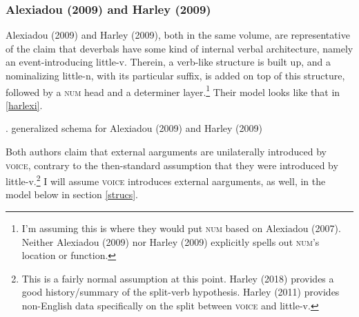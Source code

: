 \documentclass[12pt]{article}
\newcommand*{\textsub}[1]{\ensuremath{_\textrm{{\scriptsize #1}}}}
\begin{document}
\doublespacing


\subsubsection{Alexiadou (2009) and Harley (2009)}\label{priors3.2}

Alexiadou (2009) and Harley (2009), both in the same volume, are representative of the claim that deverbals have some kind of internal verbal architecture, namely an event-introducing little-v. Therein, a verb-like structure is built up, and a nominalizing little-n, with its particular suffix, is added on top of this structure, followed by a \textsc{num} head and a determiner layer.\footnote{ I'm assuming this is where they would put \textsc{num} based on Alexiadou (2007). Neither Alexiadou (2009) nor Harley (2009) explicitly spells out \textsc{num}'s location or function.} Their model looks like that in \ref{harlexi}.

\singlespacing
\ex. \label{harlexi} generalized schema for Alexiadou (2009) and Harley (2009)

\vspace*{-10pt}
\par \hfill \par
\doublespacing

Both authors claim that external aarguments are unilaterally introduced by \textsc{voice}, contrary to the then-standard assumption that they were introduced by little-v.\footnote{ This is a fairly normal assumption at this point. Harley (2018) provides a good history/summary of the split-verb hypothesis. Harley (2011) provides non-English data specifically on the split between \textsc{voice} and little-v.} I will assume \textsc{voice} introduces external aarguments, as well, in the model below in section \ref{strucs}.
\end{document}
